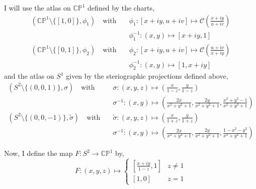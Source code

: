 \documentclass[12pt]{extarticle}
\newcommand{\sm}{\! \setminus \!}
\newcommand{\CP}{\mathbb{CP}}
\begin{document}
\begin{enumerate}
I will use the atlas on $\CP^1$ defined by the charts,
\begin{align*}
(\CP^1 \sm \{[1, 0]\}, \phi_1) \quad \text{with} \quad & \phi_1 : [x + i y, u + i v] \mapsto \mathcal{C}\left(\frac{x + iy}{u + iv}\right)
\\
& \phi_1^{-1} : (x, y) \mapsto [x + i y, 1]
\\
(\CP^1 \sm \{[0, 1]\}, \phi_2) \quad \text{with} \quad & \phi_2 : [x + i y, u + i v] \mapsto \mathcal{C}\left(\frac{u + iv}{x + iy}\right)
\\
& \phi_2^{-1} : (x, y) \mapsto [1, x + i y]
\end{align*}
and the atlas on $S^1$ given by the steriographic projections defined above,  
\begin{align*}
(S^2 \sm \{(0,0,1)\}, \sigma) \quad \text{with} \quad & \sigma : (x, y, z) \mapsto \left(\frac{x}{1 - z}, \frac{y}{1 - z}\right)
\\
& \sigma^{-1} : (x, y) \mapsto \left(\frac{2x}{x^2 + y^2 + 1}, \frac{2y}{x^2 + y^2 + 1}, \frac{x^2 + y^2 - 1}{x^2 + y^2 + 1}\right)
\\
(S^2 \sm \{(0,0,-1)\}, \tilde{\sigma}) \quad \text{with} \quad & \tilde{\sigma} : (x, y, z) \mapsto \left(\frac{x}{1 + z}, \frac{y}{1 + z}\right)
\\
& \sigma^{-1} : (x, y) \mapsto \left(\frac{2x}{x^2 + y^2 + 1}, \frac{2y}{x^2 + y^2 + 1}, \frac{1 - x^2 - y^2}{x^2 + y^2 + 1}\right)
\end{align*}

Now, I define the map $F : S^2 \to \CP^1$ by,
\[ F : (x, y, z) \mapsto
\begin{cases}
\left[\frac{x + iy}{1 - z}, 1 \right] & z \neq 1 \\
[1, 0] & z = 1
\end{cases}
\]


\end{enumerate}
\end{document}
